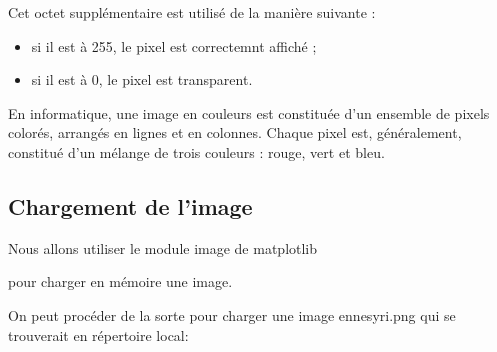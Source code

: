 \documentclass[letterpaper,10pt,english]{jupyterBook}
\begin{document}
\sphinxAtStartPar
Cet octet supplémentaire est utilisé de la manière suivante :
\begin{itemize}
\item {} 
\sphinxAtStartPar
si il est à 255, le pixel est correctemnt affiché ;

\item {} 
\sphinxAtStartPar
si il est à 0, le pixel est transparent.

\end{itemize}

\sphinxAtStartPar
En informatique, une image en couleurs est constituée d’un ensemble de pixels colorés, arrangés en lignes et en colonnes. Chaque pixel est, généralement, constitué d’un mélange de trois couleurs : rouge, vert et bleu.


\subsection{Chargement de l’image}
\label{\detokenize{notebooks/images/TRAITEMENT-DES-IMAGES:chargement-de-limage}}
\sphinxAtStartPar
Nous allons utiliser le module image de matplotlib

\sphinxAtStartPar
pour charger en mémoire une image.
\begin{sphinxVerbatimInput}

\begin{sphinxVerbatim}[commandchars=\\\{\}]
   
   
   
\end{sphinxVerbatim}
\end{sphinxVerbatimInput}

\sphinxAtStartPar
On peut procéder de la sorte pour charger une image en\sphinxhyphen{}nesyri.png qui se trouverait en répertoire local:
\begin{sphinxVerbatimInput}

\begin{sphinxVerbatim}[commandchars=\\\{\}]
  
\end{sphinxVerbatim}
\end{sphinxVerbatimInput}
\end{document}
